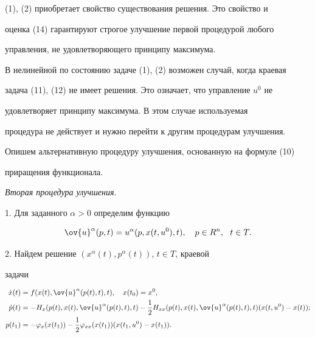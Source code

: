 (1), (2) приобретает свойство существования решения. Это свойство и


оценка (14) гарантируют строгое улучшение первой процедурой любого


управления, не удовлетворяющего принципу максимума.





В нелинейной по состоянию задаче (1), (2) возможен случай, когда краевая


задача (11), (12) не имеет решения. Это означает, что управление $u^0$ не


удовлетворяет принципу максимума. В этом случае используемая


процедура не действует и нужно перейти к другим процедурам улучшения.





Опишем альтернативную процедуру улучшения, основанную на формуле (10)


приращения функционала.





{\em Вторая процедура улучшения}.





1. Для заданного $\alpha>0$ определим функцию


$$


\ov{u}^{\alpha}(p,t)=u^{\alpha}(p,x(t,u^0),t),\quad{p}\in{R}^n,\ \ t\in{T}.


$$





2. Найдем решение $(x^{\alpha}(t),p^{\alpha}(t))$, $t\in{T}$, краевой


задачи


\begin{align}


\Dot{x}(t)&=f(x(t),\ov{u}^{\alpha}(p(t),t),t),\quad{}x(t_0)=x^{0},\\


\Dot{p}(t)&=-H_{x}(p(t),x(t),\ov{u}^{\alpha}(p(t),t),t)-


\frac{1}{2}H_{xx}(p(t),x(t),\ov{u}^{\alpha}(p(t),t),t)(x(t,u^0)-x(t));


\notag\\


p(t_1)&=-\varphi_{x}(x(t_1))-\frac{1}{2}\varphi_{xx}(x(t_1))


(x(t_1,u^0)-x(t_1)).


\end{align}





